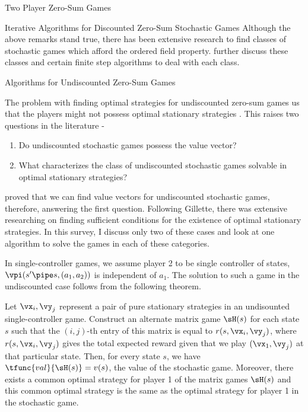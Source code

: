 \documentclass{article}
\begin{document}
\begin{psection}{Two Player Zero-Sum Games}
\begin{psubsection}{Iterative Algorithms for Discounted Zero-Sum Stochastic Games}
		Although the above remarks stand true, there has been extensive research to find classes of stochastic games which afford the ordered field property. \cite{survey} further discuss these classes and certain finite step algorithms to deal with each class.

	\end{psubsection}

	\begin{psubsection}{Algorithms for Undiscounted Zero-Sum Games}

		The problem with finding optimal strategies for undiscounted zero-sum games us that the players might not possess optimal stationary strategies \cite{gillette}. This raises two questions in the literature -
		\begin{enumerate}
			\item Do undiscounted stochastic games possess the value vector?
			\item What characterizes the class of undiscounted stochastic games solvable in optimal stationary strategies?
		\end{enumerate}

		\cite{mertens-neyman} proved that we can find value vectors for undiscounted stochastic games, therefore, answering the first question. Following Gillette, there was extensive researching on finding sufficient conditions for the existence of optimal stationary strategies. In this survey, I discuss only two of these cases and look at one algorithm to solve the games in each of these categories.


		In single-controller games, we assume player 2 to be single controller of states, \ie $\vpi(s' \pipe s, (a_1, a_2))$ is independent of $a_1$. The solution to such a game in the undiscounted case follows from the following theorem.

		\begin{theorem}
			Let $\vx_i, \vy_j$ represent a pair of pure stationary strategies in an undisounted single-controller game. Construct an alternate matrix game $\sH(s)$ for each state $s$ such that the $(i,j)$-th entry of this matrix is equal to $r(s, \vx_i, \vy_j)$, where $r(s, \vx_i, \vy_j)$ gives the total expected reward given that we play $(\vx_1, \vy_j)$ at that particular state. Then, for every state $s$, we have $\tfunc{val}{\sH(s)} = v(s)$, the value of the stochastic game. Moreover, there exists a common optimal strategy for player 1 of the matrix games $\sH(s)$ and this common optimal strategy is the same as the optimal strategy for player 1 in the stochastic game.
		\end{theorem}


\end{psubsection}
\end{psection}
\end{document}
